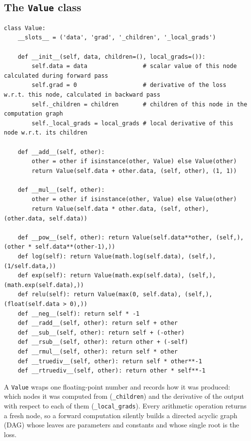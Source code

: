 \documentclass[11pt,letterpaper]{article}
\theoremstyle{remark}
\newcommand{\code}[1]{\lstinline[basicstyle=\ttfamily\small]|#1|}
\begin{document}
\subsection{The \texttt{Value} class}

\begin{lstlisting}
class Value:
    __slots__ = ('data', 'grad', '_children', '_local_grads')

    def __init__(self, data, children=(), local_grads=()):
        self.data = data                # scalar value of this node calculated during forward pass
        self.grad = 0                   # derivative of the loss w.r.t. this node, calculated in backward pass
        self._children = children       # children of this node in the computation graph
        self._local_grads = local_grads # local derivative of this node w.r.t. its children

    def __add__(self, other):
        other = other if isinstance(other, Value) else Value(other)
        return Value(self.data + other.data, (self, other), (1, 1))

    def __mul__(self, other):
        other = other if isinstance(other, Value) else Value(other)
        return Value(self.data * other.data, (self, other), (other.data, self.data))

    def __pow__(self, other): return Value(self.data**other, (self,), (other * self.data**(other-1),))
    def log(self): return Value(math.log(self.data), (self,), (1/self.data,))
    def exp(self): return Value(math.exp(self.data), (self,), (math.exp(self.data),))
    def relu(self): return Value(max(0, self.data), (self,), (float(self.data > 0),))
    def __neg__(self): return self * -1
    def __radd__(self, other): return self + other
    def __sub__(self, other): return self + (-other)
    def __rsub__(self, other): return other + (-self)
    def __rmul__(self, other): return self * other
    def __truediv__(self, other): return self * other**-1
    def __rtruediv__(self, other): return other * self**-1
\end{lstlisting}

A \code{Value} wraps one floating-point number and records how it was produced: which nodes it was computed from (\code{_children}) and the derivative of the output with respect to each of them (\code{_local_grads}). Every arithmetic operation returns a fresh node, so a forward computation silently builds a directed acyclic graph (DAG) whose leaves are parameters and constants and whose single root is the loss.
\end{document}

